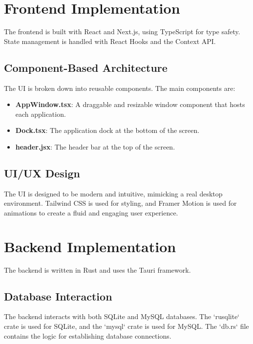 \documentclass{report}
\begin{document}
\section{Frontend Implementation}
The frontend is built with React and Next.js, using TypeScript for type safety. State management is handled with React Hooks and the Context API.

\subsection{Component-Based Architecture}
The UI is broken down into reusable components. The main components are:
\begin{itemize}
    \item \textbf{AppWindow.tsx}: A draggable and resizable window component that hosts each application.
    \item \textbf{Dock.tsx}: The application dock at the bottom of the screen.
    \item \textbf{header.jsx}: The header bar at the top of the screen.
\end{itemize}

\subsection{UI/UX Design}
The UI is designed to be modern and intuitive, mimicking a real desktop environment. Tailwind CSS is used for styling, and Framer Motion is used for animations to create a fluid and engaging user experience.



\section{Backend Implementation}
The backend is written in Rust and uses the Tauri framework.

\subsection{Database Interaction}
The backend interacts with both SQLite and MySQL databases. The `rusqlite` crate is used for SQLite, and the `mysql` crate is used for MySQL. The `db.rs` file contains the logic for establishing database connections.


\end{document}
